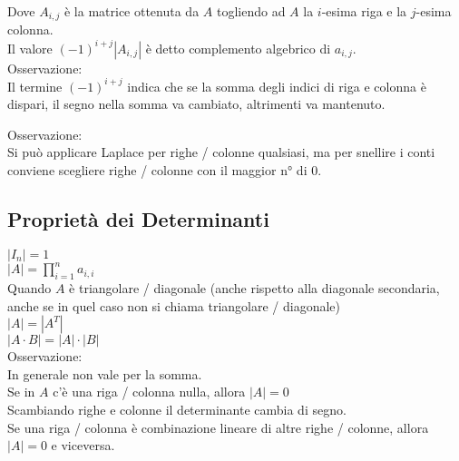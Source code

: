 \documentclass[a4paper, twoside, italian, 11pt]{book}
\begin{document}
\noindent
Dove $A_{i,j}$ è la matrice ottenuta da $A$ togliendo ad $A$ la $i$-esima riga e la $j$-esima colonna. \\

\noindent
Il valore $(-1)^{i+j} \left | A_{i,j} \right |$ è detto complemento algebrico di $a_{i,j}$. \\

\noindent
Osservazione: \\
Il termine $(-1)^{i+j}$ indica che se la somma degli indici di riga e colonna è dispari, il segno nella somma va cambiato, altrimenti va mantenuto.

\noindent
Osservazione: \\
Si può applicare Laplace per righe / colonne qualsiasi, ma per snellire i conti conviene scegliere righe / colonne con il maggior n° di $0$.


\subsection{Proprietà dei Determinanti}

$\left | I_n \right | = 1$ \\

\noindent
$\left | A \right | = \prod_{i=1}^n a_{i,i}$ \\

\noindent
Quando $A$ è triangolare / diagonale (anche rispetto alla diagonale secondaria, anche se in quel caso non si chiama triangolare / diagonale) \\

\noindent
$\left | A \right | = \left | A^T \right |$ \\

\noindent
$\left | A \cdot B \right | = \left | A \right | \cdot \left | B \right |$ \\

\noindent
Osservazione: \\
In generale non vale per la somma. \\

\noindent
Se in $A$ c'è una riga / colonna nulla, allora $\left | A \right | = 0$ \\

\noindent
Scambiando righe e colonne %
il determinante cambia di segno. \\

\noindent
Se una riga / colonna è combinazione lineare di altre righe / colonne, allora $\left | A \right | = 0$ e viceversa.
\end{document}
